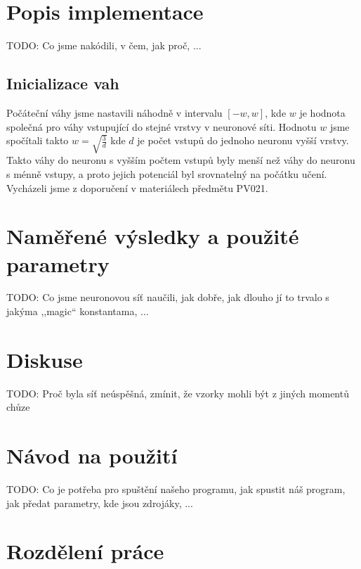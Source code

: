 \documentclass[a4paper, 10pt]{article}
\begin{document}
\section{Popis implementace}
  \begin{multicols}{2}
    TODO: Co jsme nakódili, v čem, jak proč, ...
    \subsection{Inicializace vah}
      Počáteční váhy jsme nastavili náhodně v intervalu $[-w,w]$, kde $w$ je hodnota společná pro váhy vstupující do stejné vrstvy v neuronové síti. Hodnotu $w$ jsme spočítali takto $w = \sqrt{\frac{3}{d}}$ kde $d$ je počet vstupů do jednoho neuronu vyšší vrstvy. Takto váhy do neuronu s vyšším počtem vstupů byly menší než váhy do neuronu s ménně vstupy, a proto jejich potenciál byl srovnatelný na počátku učení. Vycházeli jsme z doporučení v materiálech předmětu PV021.

  \end{multicols}
\section{Naměřené výsledky a použité parametry}
  \begin{multicols}{2}
  TODO: Co jsme neuronovou síť naučili, jak dobře, jak dlouho jí to trvalo s jakýma ,,magic`` konstantama, ...
  \end{multicols}
\section{Diskuse}
  \begin{multicols}{2}
    TODO: Proč byla síť neúspěšná, zmínit, že vzorky mohli být z jiných momentů chůze
  \end{multicols}
\appendix
\section{Návod na použití}
  TODO: Co je potřeba pro spuštění našeho programu, jak spustit náš program, jak předat parametry, kde jsou zdrojáky, ...
\section{Rozdělení práce}
\end{document}
